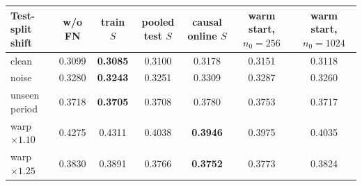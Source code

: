 \begin{tabular}{lcccccc}
\toprule
Test-split shift & w/o FN & train $S$ & pooled test $S$ & causal online $S$ & warm start, $n_0{=}256$ & warm start, $n_0{=}1024$ \\
\midrule
clean & 0.3099 & \textbf{0.3085} & 0.3100 & 0.3178 & 0.3151 & 0.3118 \\
noise & 0.3280 & \textbf{0.3243} & 0.3251 & 0.3309 & 0.3287 & 0.3260 \\
unseen period & 0.3718 & \textbf{0.3705} & 0.3708 & 0.3780 & 0.3753 & 0.3717 \\
warp $\times1.10$ & 0.4275 & 0.4311 & 0.4038 & \textbf{0.3946} & 0.3975 & 0.4035 \\
warp $\times1.25$ & 0.3830 & 0.3891 & 0.3766 & \textbf{0.3752} & 0.3773 & 0.3824 \\
\bottomrule
\end{tabular}
